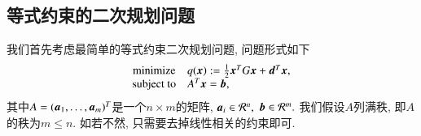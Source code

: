 \subsection{等式约束的二次规划问题}
\label{subsec:7.2.1}

我们首先考虑最简单的等式约束二次规划问题, 问题形式如下
\begin{equation}
\label{eq:quadratic-programming-eq-constrained}
\begin{array}{cl}
\text{minimize} & q({\bm{x}}) := \frac{1}{2} {\bm{x}}^T G {\bm{x}} + {\bm{d}}^T {\bm{x}}, \\
\text{subject to} & A^T {\bm{x}} = {\bm{b}},
\end{array}
\end{equation}
其中$A = ({\bm{a}}_1, \ldots, {\bm{a}}_m)^T$是一个$n \times m$的矩阵, ${\bm{a}}_i \in \mathcal{R}^n,$ ${\bm{b}} \in \mathcal{R}^m.$ 我们假设$A$列满秩, 即$A$的秩为$m \leqslant n.$ 如若不然, 只需要去掉线性相关的约束即可.


